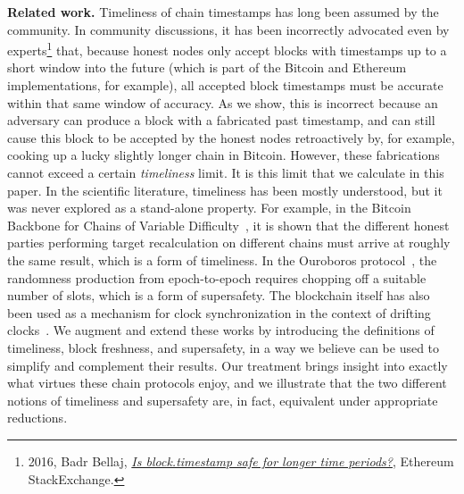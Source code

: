 \noindent
\textbf{Related work.}
Timeliness of chain timestamps has long been assumed by the community.
In community discussions, it has been incorrectly
advocated even by experts\footnote{2016, Badr Bellaj, \href{https://ethereum.stackexchange.com/questions/6795/is-block-timestamp-safe-for-longer-time-periods}{\emph{Is block.timestamp safe for longer time periods?}}, Ethereum StackExchange.} that, because
honest nodes only accept blocks with timestamps up to a short window into the future
(which is part of the Bitcoin and Ethereum implementations, for example),
all accepted block timestamps must be accurate within that same window of accuracy.
As we show, this is incorrect because an adversary can produce a block with a fabricated past timestamp,
and can still cause this block to be accepted by the honest nodes retroactively by, for example, cooking
up a lucky slightly longer chain in Bitcoin. However, these fabrications
cannot exceed a certain \emph{timeliness} limit. It is this limit that we calculate in this paper.
In the scientific literature, timeliness has been mostly understood, but it was never explored
as a stand-alone property. For example, in the Bitcoin Backbone for Chains of Variable Difficulty~\cite{backbone-var},
it is shown that the different honest parties performing target recalculation on different chains
must arrive at roughly the same result, which is a form of timeliness. In the Ouroboros protocol~\cite{ouroboros},
the randomness production from epoch-to-epoch requires chopping off a suitable number of slots,
which is a form of supersafety. The blockchain itself has also been used as a mechanism for clock
synchronization in the context of drifting clocks~\cite{klepsydra,chronos}. We augment and extend
these works by introducing the definitions of timeliness, block freshness, and supersafety, in a way
we believe can be used to simplify and complement their results. Our treatment brings insight into
exactly what virtues these chain protocols enjoy, and we illustrate that the two different
notions of timeliness and supersafety are, in fact, equivalent under appropriate reductions.
